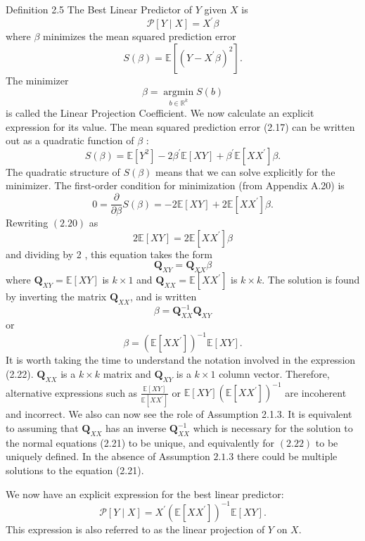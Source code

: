 \documentclass[10pt]{article}
\begin{document}
Definition 2.5 The Best Linear Predictor of $Y$ given $X$ is
$$
\mathscr{P}[Y \mid X]=X^{\prime} \beta
$$
where $\beta$ minimizes the mean squared prediction error
$$
S(\beta)=\mathbb{E}\left[\left(Y-X^{\prime} \beta\right)^{2}\right] .
$$
The minimizer
$$
\beta=\underset{b \in \mathbb{R}^{k}}{\operatorname{argmin}} S(b)
$$
is called the Linear Projection Coefficient. We now calculate an explicit expression for its value. The mean squared prediction error (2.17) can be written out as a quadratic function of $\beta$ :
$$
S(\beta)=\mathbb{E}\left[Y^{2}\right]-2 \beta^{\prime} \mathbb{E}[X Y]+\beta^{\prime} \mathbb{E}\left[X X^{\prime}\right] \beta .
$$
The quadratic structure of $S(\beta)$ means that we can solve explicitly for the minimizer. The first-order condition for minimization (from Appendix A.20) is
$$
0=\frac{\partial}{\partial \beta} S(\beta)=-2 \mathbb{E}[X Y]+2 \mathbb{E}\left[X X^{\prime}\right] \beta .
$$
Rewriting $(2.20)$ as
$$
2 \mathbb{E}[X Y]=2 \mathbb{E}\left[X X^{\prime}\right] \beta
$$
and dividing by 2 , this equation takes the form
$$
\boldsymbol{Q}_{X Y}=\boldsymbol{Q}_{X X} \beta
$$
where $\boldsymbol{Q}_{X Y}=\mathbb{E}[X Y]$ is $k \times 1$ and $\boldsymbol{Q}_{X X}=\mathbb{E}\left[X X^{\prime}\right]$ is $k \times k$. The solution is found by inverting the matrix $\boldsymbol{Q}_{X X}$, and is written
$$
\beta=\boldsymbol{Q}_{X X}^{-1} \boldsymbol{Q}_{X Y}
$$
or
$$
\beta=\left(\mathbb{E}\left[X X^{\prime}\right]\right)^{-1} \mathbb{E}[X Y] .
$$
It is worth taking the time to understand the notation involved in the expression (2.22). $\boldsymbol{Q}_{X X}$ is a $k \times k$ matrix and $\boldsymbol{Q}_{X Y}$ is a $k \times 1$ column vector. Therefore, alternative expressions such as $\frac{\mathbb{E}[X Y]}{\mathbb{E}\left[X X^{\prime}\right]}$ or $\mathbb{E}[X Y]\left(\mathbb{E}\left[X X^{\prime}\right]\right)^{-1}$ are incoherent and incorrect. We also can now see the role of Assumption 2.1.3. It is equivalent to assuming that $\boldsymbol{Q}_{X X}$ has an inverse $\boldsymbol{Q}_{X X}^{-1}$ which is necessary for the solution to the normal equations (2.21) to be unique, and equivalently for $(2.22)$ to be uniquely defined. In the absence of Assumption $2.1 .3$ there could be multiple solutions to the equation (2.21).

We now have an explicit expression for the best linear predictor:
$$
\mathscr{P}[Y \mid X]=X^{\prime}\left(\mathbb{E}\left[X X^{\prime}\right]\right)^{-1} \mathbb{E}[X Y] .
$$
This expression is also referred to as the linear projection of $Y$ on $X$.
\end{document}
